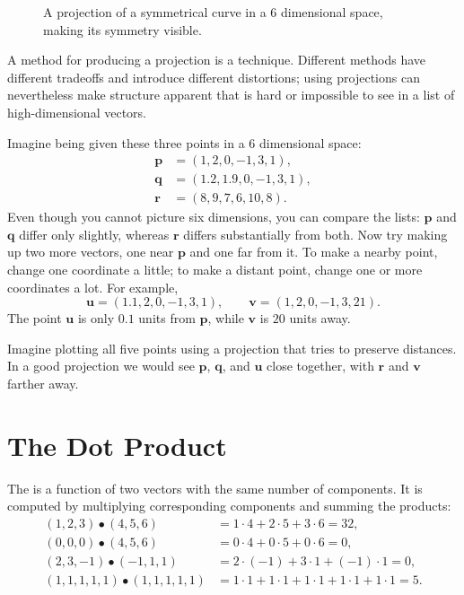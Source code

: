 \begin{figure}[h]
\centering
{}
\caption[Scott Hotton.]{A projection of a symmetrical curve in a 6 dimensional space, making its symmetry visible.}
\label{abridged_projection}
\end{figure}

A method for producing a projection is a  technique. Different methods have different tradeoffs and introduce different distortions; using projections can nevertheless make structure apparent that is hard or impossible to see in a list of high-dimensional vectors.

Imagine being given these three points in a 6 dimensional space:
\[
\begin{aligned}
\mathbf{p}&=(1,2,0,-1,3,1),\\
\mathbf{q}&=(1.2,1.9,0,-1,3,1),\\
\mathbf{r}&=(8,9,7,6,10,8).
\end{aligned}
\]
Even though you cannot picture six dimensions, you can compare the lists: $\mathbf{p}$ and $\mathbf{q}$ differ only slightly, whereas $\mathbf{r}$ differs substantially from both. Now try making up two more vectors, one near $\mathbf{p}$ and one far from it. To make a nearby point, change one coordinate a little; to make a distant point, change one or more coordinates a lot. For example,
\[
\mathbf{u}=(1.1,2,0,-1,3,1),\qquad
\mathbf{v}=(1,2,0,-1,3,21).
\]
The point $\mathbf{u}$ is only $0.1$ units from $\mathbf{p}$, while $\mathbf{v}$ is $20$ units away.

Imagine plotting all five points using a projection that tries to preserve distances. In a good projection we would see $\mathbf{p}$, $\mathbf{q}$, and $\mathbf{u}$ close together, with $\mathbf{r}$ and $\mathbf{v}$ farther away. 

\section{The Dot Product}

The  is a function of two vectors with the same number of components. It is computed by multiplying corresponding components and summing the products:
\begin{align*}
(1,2,3)\bullet(4,5,6) &= 1\cdot4+2\cdot5+3\cdot6=32,\\
(0,0,0)\bullet(4,5,6) &= 0\cdot4+0\cdot5+0\cdot6=0,\\
(2,3,-1)\bullet(-1,1,1) &= 2\cdot(-1)+3\cdot1+(-1)\cdot1=0,\\
(1,1,1,1,1)\bullet(1,1,1,1,1) &= 1\cdot1+1\cdot1+1\cdot1+1\cdot1+1\cdot1=5.
\end{align*}


